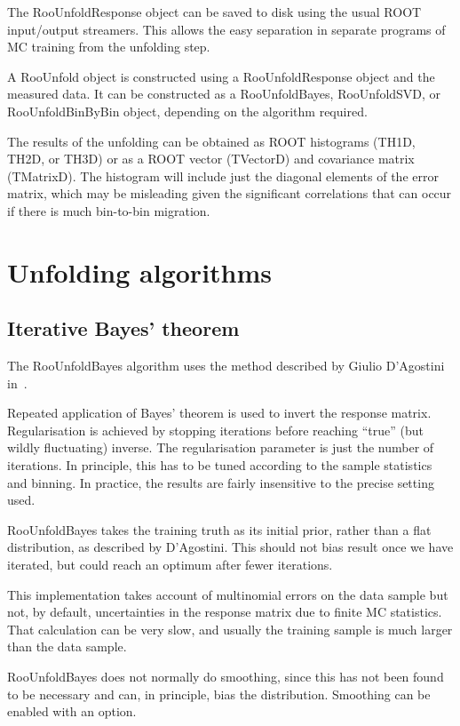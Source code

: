 \documentclass{desyproc}
\begin{document}
The RooUnfoldResponse object can be saved to disk using the usual ROOT input/output
streamers. This allows the easy separation in separate programs
of MC training from the unfolding step.

A RooUnfold object is constructed using a RooUnfoldResponse object and the measured
data. It can be constructed as a RooUnfoldBayes, RooUnfoldSVD, or RooUnfoldBinByBin
object, depending on the algorithm required.

The results of the unfolding can be obtained as ROOT histograms (TH1D, TH2D, or TH3D)
or as a ROOT vector (TVectorD) and covariance matrix (TMatrixD). The histogram will
include just the diagonal elements of the error matrix, which may be misleading
given the significant correlations that can occur if there is much bin-to-bin migration.

\section{Unfolding algorithms}

\subsection{Iterative Bayes' theorem}

The RooUnfoldBayes algorithm uses the method described by Giulio D'Agostini in~\cite{D'Agostini:1994zf}.

Repeated application of Bayes' theorem is used to invert the response matrix.
Regularisation is achieved by stopping iterations before reaching ``true''
(but wildly fluctuating) inverse.
The regularisation parameter is just the number of iterations.
In principle, this has to be tuned according to the sample statistics and binning.
In practice, the results are fairly insensitive to the precise setting used.

RooUnfoldBayes takes the training truth as its initial prior, rather than a flat distribution,
as described by D'Agostini.
This should not bias result once we have iterated, but could reach an optimum after fewer iterations.

This implementation takes account of multinomial errors on the data sample but not,
by default, uncertainties in the response matrix due to finite MC statistics.
That calculation can be very slow, and usually the training sample is much larger
than the data sample.

RooUnfoldBayes does not normally do smoothing, since this has not been found to be necessary
and can, in principle, bias the distribution. Smoothing can be enabled with an option.
\end{document}
